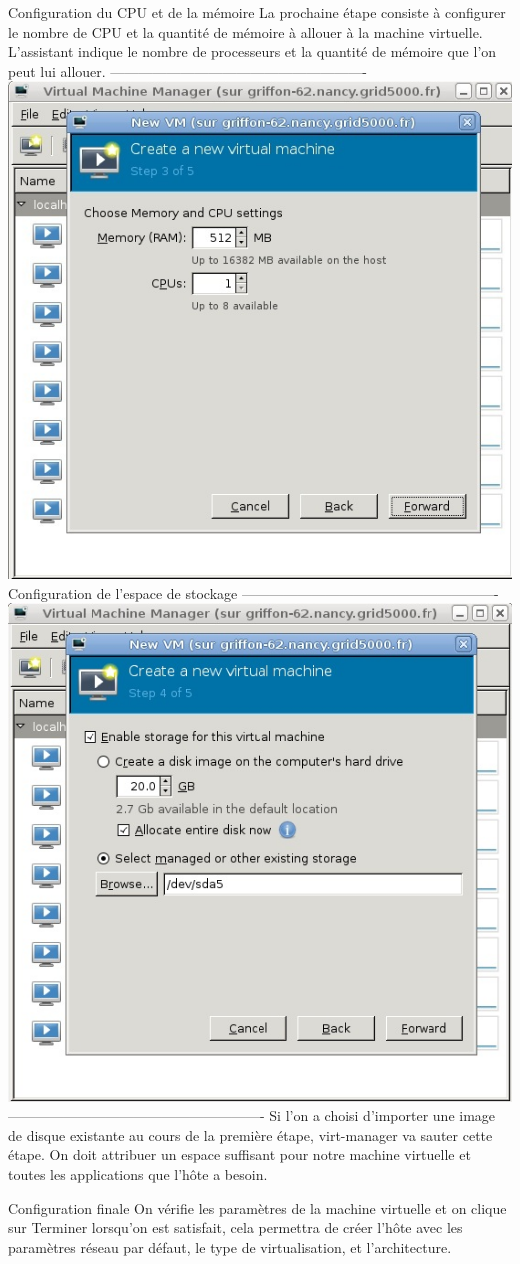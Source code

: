 Configuration du CPU et de la mémoire
La prochaine étape consiste à configurer le nombre de CPU et la quantité de mémoire à allouer à la machine virtuelle. L'assistant indique le nombre de processeurs et la quantité de mémoire que l'on peut lui allouer.
-------------------------------------------------------
\includegraphics{images/cpu.jpg}
Configuration de l'espace de stockage
-------------------------------------------------------
\includegraphics{images/Storage.jpg}
-------------------------------------------------------
 Si l'on a choisi d'importer une image de disque existante au cours de la première étape, virt-manager va sauter cette étape.
On doit attribuer un espace suffisant pour notre machine virtuelle et toutes les applications que l'hôte a besoin.

Configuration finale
On vérifie les paramètres de la machine virtuelle et on clique sur Terminer lorsqu'on est satisfait, cela permettra de créer l'hôte avec les paramètres réseau par défaut, le type de virtualisation, et l'architecture.
